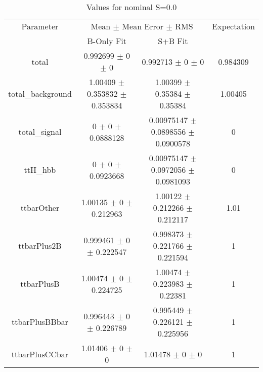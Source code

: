 \begin{table}
\centering
\caption{Values for nominal S=0.0}
\begin{tabular}{cccc}
\toprule
Parameter & \multicolumn{2}{c}{Mean $\pm$ Mean Error $\pm$ RMS} & Expectation\\
 & B-Only Fit & S+B Fit & \\
\midrule
total & \num{0.992699} $\pm$ \num{0} $\pm$ \num{0} & \num{0.992713} $\pm$ \num{0} $\pm$ \num{0} & \num{0.984309}\\
total\_background & \num{1.00409} $\pm$ \num{0.353832} $\pm$ \num{0.353834} & \num{1.00399} $\pm$ \num{0.35384} $\pm$ \num{0.35384} & \num{1.00405}\\
total\_signal & \num{0} $\pm$ \num{0} $\pm$ \num{0.0888128} & \num{0.00975147} $\pm$ \num{0.0898556} $\pm$ \num{0.0900578} & \num{0}\\
ttH\_hbb & \num{0} $\pm$ \num{0} $\pm$ \num{0.0923668} & \num{0.00975147} $\pm$ \num{0.0972056} $\pm$ \num{0.0981093} & \num{0}\\
ttbarOther & \num{1.00135} $\pm$ \num{0} $\pm$ \num{0.212963} & \num{1.00122} $\pm$ \num{0.212266} $\pm$ \num{0.212117} & \num{1.01}\\
ttbarPlus2B & \num{0.999461} $\pm$ \num{0} $\pm$ \num{0.222547} & \num{0.998373} $\pm$ \num{0.221766} $\pm$ \num{0.221594} & \num{1}\\
ttbarPlusB & \num{1.00474} $\pm$ \num{0} $\pm$ \num{0.224725} & \num{1.00474} $\pm$ \num{0.223983} $\pm$ \num{0.22381} & \num{1}\\
ttbarPlusBBbar & \num{0.996443} $\pm$ \num{0} $\pm$ \num{0.226789} & \num{0.995449} $\pm$ \num{0.226121} $\pm$ \num{0.225956} & \num{1}\\
ttbarPlusCCbar & \num{1.01406} $\pm$ \num{0} $\pm$ \num{0} & \num{1.01478} $\pm$ \num{0} $\pm$ \num{0} & \num{1}\\
\bottomrule
\end{tabular}
\end{table}